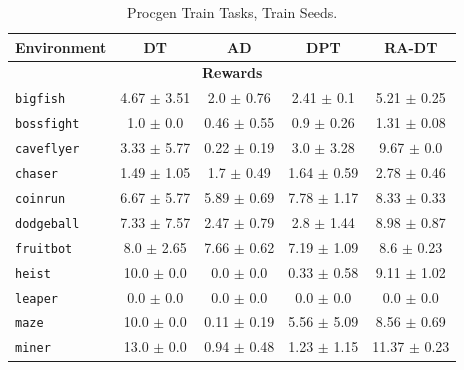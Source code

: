 \begin{table}[h]
    \centering
    \caption{Procgen Train Tasks, Train Seeds.}
    \begin{tabular}{@{} l c c c c@{}}
    \toprule
    \textbf{Environment} & \textbf{DT} & \textbf{AD} & \textbf{DPT} & \textbf{RA-DT} \\ \midrule
    \multicolumn{5}{c}{\textbf{Rewards}} \\ 
    \texttt{bigfish}     &                  4.67 $\pm$ 3.51 &                    2.0 $\pm$ 0.76 &                    2.41 $\pm$ 0.1 &            5.21 $\pm$ 0.25 \\
    \texttt{bossfight}   &                    1.0 $\pm$ 0.0 &                   0.46 $\pm$ 0.55 &                    0.9 $\pm$ 0.26 &            1.31 $\pm$ 0.08 \\
    \texttt{caveflyer}   &                  3.33 $\pm$ 5.77 &                   0.22 $\pm$ 0.19 &                    3.0 $\pm$ 3.28 &             9.67 $\pm$ 0.0 \\
    \texttt{chaser}      &                  1.49 $\pm$ 1.05 &                    1.7 $\pm$ 0.49 &                   1.64 $\pm$ 0.59 &            2.78 $\pm$ 0.46 \\
    \texttt{coinrun}     &                  6.67 $\pm$ 5.77 &                   5.89 $\pm$ 0.69 &                   7.78 $\pm$ 1.17 &            8.33 $\pm$ 0.33 \\
    \texttt{dodgeball}   &                  7.33 $\pm$ 7.57 &                   2.47 $\pm$ 0.79 &                    2.8 $\pm$ 1.44 &            8.98 $\pm$ 0.87 \\
    \texttt{fruitbot}    &                   8.0 $\pm$ 2.65 &                   7.66 $\pm$ 0.62 &                   7.19 $\pm$ 1.09 &             8.6 $\pm$ 0.23 \\
    \texttt{heist}       &                   10.0 $\pm$ 0.0 &                     0.0 $\pm$ 0.0 &                   0.33 $\pm$ 0.58 &            9.11 $\pm$ 1.02 \\
    \texttt{leaper}      &                    0.0 $\pm$ 0.0 &                     0.0 $\pm$ 0.0 &                     0.0 $\pm$ 0.0 &              0.0 $\pm$ 0.0 \\
    \texttt{maze}        &                   10.0 $\pm$ 0.0 &                   0.11 $\pm$ 0.19 &                   5.56 $\pm$ 5.09 &            8.56 $\pm$ 0.69 \\
    \texttt{miner}      &                   13.0 $\pm$ 0.0 &                   0.94 $\pm$ 0.48 &                   1.23 $\pm$ 1.15 &           11.37 $\pm$ 0.23 \\

\end{tabular}
\end{table}
